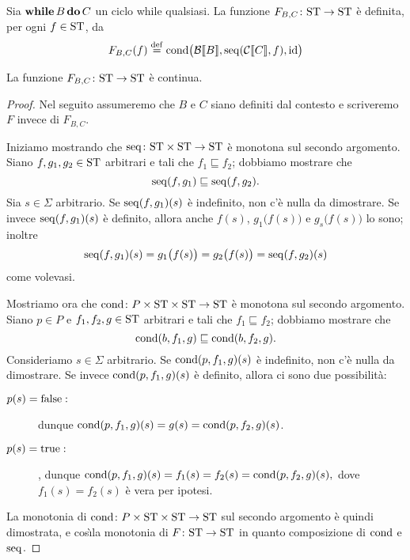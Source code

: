 \begin{definizione}
Sia $\mathop{\textup{\textbf{while}}} B \mathop{\textup{\textbf{do}}} C$ un ciclo while qualsiasi.
La funzione $\mathord{F_{B,C}}\colon\mathrm{ST}\to\mathrm{ST}$ \`e definita,
per ogni $f \in \mathrm{ST}$, da
\[
  F_{B,C}(f)
    \defeq
      \cond\bigl(\calB \llbracket B \rrbracket,
                         \seq(\calC \llbracket C \rrbracket, f),
                         \mathrm{id}\bigr)
\]
\end{definizione}

\begin{teorema}
La funzione $\mathord{F_{B,C}}\colon\mathrm{ST}\to\mathrm{ST}$ è continua.
\end{teorema}

\begin{proof}
Nel seguito assumeremo che $B$ e $C$ siano definiti dal contesto e scriveremo
$F$ invece di $F_{B,C}$.

Iniziamo mostrando che $\mathord{\mathrm{seq}}\colon\mathrm{ST} \times \mathrm{ST}\to\mathrm{ST}$
è monotona sul secondo argomento.
Siano $f, g_1, g_2 \in \mathrm{ST}$ arbitrari e tali che
$f_1 \sqsubseteq f_2$;  dobbiamo mostrare che
\[
  \mathrm{seq}(f, g_1) \sqsubseteq \mathrm{seq}(f, g_2).
\]
Sia $s \in \Sigma$ arbitrario.
Se $\mathrm{seq}(f, g_1)(s)$ \`e indefinito, non c'\`e nulla da dimostrare.
Se invece $\mathrm{seq}(f, g_1)(s)$ \`e definito,
allora anche $f(s)$, $g_1\bigl(f(s)\bigr)$ e $g_s\bigl(f(s)\bigr)$
lo sono;  inoltre
\[
    \mathrm{seq}(f, g_1)(s) = g_1\bigl(f(s)\bigr)
                    = g_2\bigl(f(s)\bigr)
  = \mathrm{seq}(f, g_2)(s)
\]
come volevasi.

Mostriamo ora che $\mathord{\mathrm{cond}}\colon P \times \mathrm{ST} \times \mathrm{ST}\to\mathrm{ST}$
è monotona sul secondo argomento.
Siano $p \in P$ e $f_1, f_2, g \in \mathrm{ST}$ arbitrari e tali che
$f_1 \sqsubseteq f_2$;  dobbiamo mostrare che
\[
  \mathrm{cond}(b, f_1, g) \sqsubseteq \mathrm{cond}(b, f_2, g).
\]
Consideriamo $s \in \Sigma$ arbitrario.
Se $\mathrm{cond}(p, f_1, g)(s)$ \`e indefinito, non c'\`e nulla da dimostrare.
Se invece $\mathrm{cond}(p, f_1, g)(s)$ \`e definito,
allora ci sono due possibilità:
\begin{description}
\item[$p(s) = \mathrm{false}:$] dunque
\(
  \mathrm{cond}(p, f_1, g)(s) = g(s) = \mathrm{cond}(p, f_2, g)(s)
\).
\item[$p(s) = \mathrm{true}:$], dunque
\(
  \mathrm{cond}(p, f_1, g)(s) = f_1(s) = f_2(s) = \mathrm{cond}(p, f_2, g)(s),
\)
dove $f_1(s) = f_2(s)$ è vera per ipotesi.
\end{description}
La monotonia di $\mathord{\mathrm{cond}}\colon P \times \mathrm{ST} \times \mathrm{ST}\to\mathrm{ST}$
sul secondo argomento è quindi dimostrata, e cos\`\i la monotonia
di $\mathord{F}\colon\mathrm{ST}\to\mathrm{ST}$ in quanto composizione di $\mathrm{cond}$ e $\mathrm{seq}$.


\end{proof}
